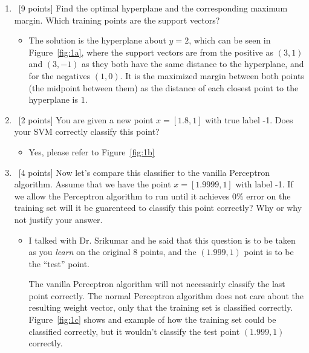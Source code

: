 \begin{enumerate}
\item ~[9 points] Find the optimal hyperplane and the corresponding
  maximum margin. Which training points are the support vectors?

\begin{itemize}
\item The solution is the hyperplane about $y=2$, which can be seen in Figure~\ref{fig:1a}, where the support vectors are from the positive as $(3,1)$ and $(3,-1)$ as they both have the same distance to the hyperplane, and for the negatives $(1, 0)$. It is the maximized margin between both points (the midpoint between them) as the distance of each closest point to the hyperplane is $1$.
\end{itemize}

\item ~[2 points] You are given a new point $x = [1.8,1]$ with true
  label -1. Does your SVM correctly classify this point?

\begin{itemize}
\item Yes, please refer to Figure~\ref{fig:1b}
\end{itemize}  



\item ~[4 points] Now let's compare this classifier to the vanilla
  Perceptron algorithm. Assume that we have the point $x = [1.9999,1]$
  with label -1. If we allow the Perceptron algorithm to run until it
  achieves 0\% error on the training set will it be guarenteed to
  classify this point correctly? Why or why not justify your answer.

\begin{itemize}
\item I talked with Dr. Srikumar and he said that this question is to be taken as you {\em learn} on the original 8 points, and the $(1.999,1)$ point is to be the ``test'' point. 

The vanilla Perceptron algorithm will not necessairly classify the last point correctly. The normal Perceptron algorithm does not care about the resulting weight vector, only that the training set is classified correctly. Figure~\ref{fig:1c} shows and example of how the training set could be classified correctly, but it wouldn't classify the test point $(1.999,1)$ correctly.
\end{itemize}  


\end{enumerate}

